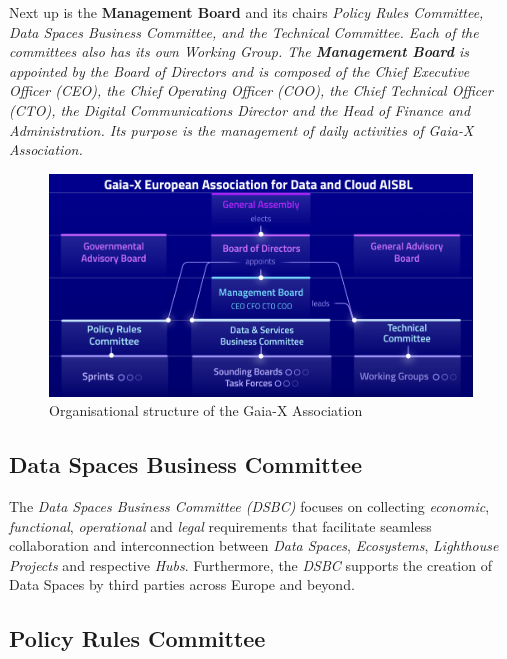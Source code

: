 Next up is the \textbf{Management Board} and its chairs \em \textit{Policy Rules Committee}, \textit{Data Spaces Business Committee}, and the \textit{Technical Committee}.
Each of the committees also has its own \textit{Working Group}.
The \textbf{Management Board} is appointed by the \textit{Board of Directors} and is composed of the Chief Executive Officer (CEO), the Chief Operating Officer (COO), the Chief Technical Officer (CTO), the Digital Communications Director and the Head of Finance and Administration.
Its purpose is the management of daily activities of \textit{Gaia-X Association}.

\begin{figure}
    \centering
    \includegraphics[width=\textwidth]{figures/management-board-structure.png}
    \caption{Organisational structure of the Gaia-X Association~\cite{gaiax}}\label{fig:organisational-board-structure}
\end{figure}

\subsection{Data Spaces Business Committee}\label{subsec:data-spaces-business-committee}

The \textit{Data Spaces Business Committee (DSBC)} focuses on collecting \textit{economic}, \textit{functional}, \textit{operational} and \textit{legal} requirements that facilitate seamless collaboration and interconnection between \textit{Data Spaces}, \textit{Ecosystems}, \textit{Lighthouse Projects} and respective \textit{Hubs}\cite{gaiax}. %
Furthermore, the \textit{DSBC} supports the creation of Data Spaces by third parties across Europe and beyond.

\subsection{Policy Rules Committee}\label{subsec:policy-rules-committee}

